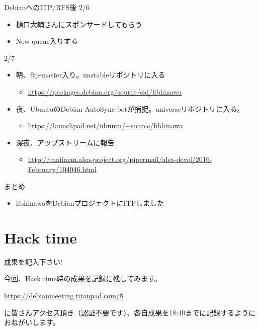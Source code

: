 \begin{frame}{DebianへのITP/RFS後}
  2/6
  \begin{itemize}
  \item 樋口大輔さんにスポンサードしてもらう
  \item New queue入りする
  \end{itemize}
  2/7
  \begin{itemize}
  \item 朝、ftp-master入り。unstableリポジトリに入る
  \begin{itemize}
  \item \url{https://packages.debian.org/source/sid/libhinawa}
  \end{itemize}
  \item 夜、UbuntuのDebian AutoSync botが捕捉。universeリポジトリに入る。
  \begin{itemize}
  \item \url{https://launchpad.net/ubuntu/+source/libhinawa}
  \end{itemize}
  \item 深夜、アップストリームに報告
  \begin{itemize}
  \item
\url{http://mailman.alsa-project.org/pipermail/alsa-devel/2016-February/104046.html}
  \end{itemize}
  \end{itemize}
\end{frame}

\begin{frame}{まとめ}
\begin{itemize}
\item libhinawaをDebianプロジェクトにITPしました
\end{itemize}
\end{frame}

\section{Hack time}

\begin{frame}{成果を記入下さい!}

  今回、Hack time時の成果を記録に残してみます。

\url{https://debianmeeting.titanpad.com/8}

に皆さんアクセス頂き（認証不要です）、各自成果を18:40までに記録するようにおねがいします。

\end{frame}
  
